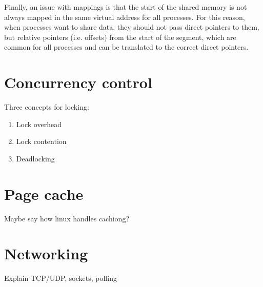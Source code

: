 Finally, an issue with mappings is that the start of the shared memory is not 
always mapped in the same virtual address for all processes. For this reason, 
when processes want to share data, they should not pass direct pointers to 
them, but relative pointers (i.e. offsets) from the start of the segment, which 
are common for all processes and can be translated to the correct direct 
pointers.

\section{Concurrency control}


Three concepts for locking:

\begin{enumerate}
	\item Lock overhead
	\item Lock contention
	\item Deadlocking
\end{enumerate}

\section{Page cache}

Maybe say how linux handles cachiong?

\section{Networking}

Explain TCP/UDP, sockets, polling
